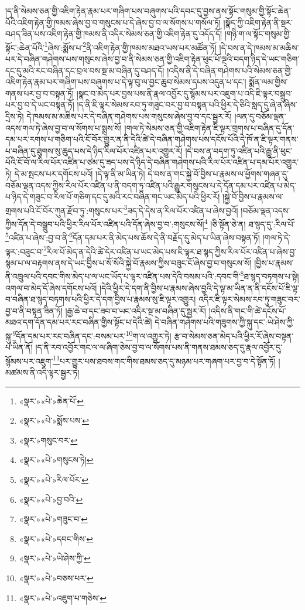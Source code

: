 །ད་ནི་སེམས་ཅན་གྱི་འཇིག་རྟེན་རྣམ་པར་གཞིག་པས་བཞུགས་པའི་དབང་དུ་བྱས་ནས་སྟོང་གསུམ་གྱི་སྟོང་ཆེན་པོའི་འཇིག་རྟེན་གྱི་ཁམས་ཞེས་བྱ་བ་གསུངས་པ་དེ་ཞེས་བྱ་བ་ལ་སོགས་པ་གསོལ་ཏོ། །སྣོད་ཀྱི་འཇིག་རྟེན་ནི་སྔར་བཤད་ཟིན་པས་འཇིག་རྟེན་གྱི་ཁམས་ནི་འདིར་སེམས་ཅན་གྱི་འཇིག་རྟེན་དུ་འདོད་དོ། །གཉི་ག་ལ་སྟོང་གསུམ་གྱི་སྟོང་:ཆེན་པོའི་\footnote{«སྣར་»«པེ་»ཆེན་པོ་}ཞེས་:སྨོས་པ་\footnote{«སྣར་»«པེ་»སྨོས་པས་}ནི་འཇིག་རྟེན་གྱི་ཁམས་མཐའ་ཡས་པར་མཚོན་ཏོ། །དེ་བས་ན་དེ་ཁམས་མ་མཆིས་པར་དེ་བཞིན་གཤེགས་པས་གསུངས་ཞེས་བྱ་བ་ནི་སེམས་ཅན་གྱི་འཇིག་རྟེན་ཕུང་པོ་ལྔའི་བདག་ཉིད་དེ་ཡང་གཅིག་དང་དུ་མའི་རང་བཞིན་དང་བྲལ་བས་སྔ་མ་བཞིན་དུ་བཤད་དོ། །འདིས་ནི་དེ་བཞིན་གཤེགས་པའི་སེམས་ཅན་གྱི་འཇིག་རྟེན་རྣམ་པར་གཞིག་པས་བཞུགས་པ་དེ་ལྟ་བུ་ལ་བྱང་ཆུབ་སེམས་དཔས་འདུན་པ་དང་། སྨོན་ལམ་གྱིས་གནས་པར་བྱ་བ་བསྟན་ཏོ། །སྣང་བ་མེད་པར་བྱས་པས་ནི་རྣལ་འབྱོར་དུ་སྙོམས་པར་འཇུག་པ་འདི་ཇི་ལྟར་བསྒྲུབ་པར་བྱ་བ་དེ་ཡང་བསྟན་ཏོ། །ད་ནི་ཇི་ལྟར་སེམས་རབ་ཏུ་གཟུང་བར་བྱ་བ་བསྟན་པའི་ཕྱིར་དེ་ཅིའི་སླད་དུ་ཞེ་ན་ཞེས་དྲིས་ཏེ། དེ་ཁམས་མ་མཆིས་པར་དེ་བཞིན་གཤེགས་པས་གསུངས་ཞེས་བྱ་བ་དང་སྦྱར་རོ། །ལན་དུ་བཅོམ་ལྡན་འདས་གལ་ཏེ་ཞེས་བྱ་བ་ལ་སོགས་པ་སྨྲས་སོ། །གལ་ཏེ་སེམས་ཅན་གྱི་འཇིག་རྟེན་ཇི་ལྟར་གྲགས་པ་བཞིན་དུ་དོན་དམ་པར་རགས་པ་གཅིག་པའི་ངོ་བོར་གྱུར་ན་ནི་དེའི་ཚེ་དེ་བཞིན་གཤེགས་པས་དངོས་པོའི་དེ་ཁོ་ན་ཇི་ལྟར་གནས་པ་བཞིན་དུ་ཐུགས་སུ་ཆུད་པས་དེ་ཉིད་རིལ་པོར་འཛིན་པར་འགྱུར་རོ། །དེ་བས་ན་བདག་ཏུ་འཛིན་པའི་རྒྱུ་ནི་ཕུང་པོའི་ངོ་བོ་ལ་རིལ་པོར་འཛིན་པ་ཙམ་དུ་ཟད་པས་དེ་ཉིད་དེ་བཞིན་གཤེགས་པའི་རིལ་པོར་འཛིན་པ་དམ་པོར་འགྱུར་ཏེ། དེ་མ་སྤངས་པར་དགོངས་པའོ། །དེ་ལྟ་ནི་མ་ཡིན་ཏེ། དེ་བས་ན་གང་སྐྱེ་བོ་བྱིས་པ་རྣམས་ལ་ཕྱོགས་གཞན་དུ་བཅོམ་ལྡན་འདས་ཀྱིས་རིལ་པོར་འཛིན་པ་ནི་བདག་ཏུ་འཛིན་པའི་རྒྱུར་གསུངས་པ་དེ་དོན་དམ་པར་འཛིན་པ་མེད་པ་ཉིད་དེ་གཟུང་བ་རིལ་པོ་གཅིག་དང་དུ་མའི་རང་བཞིན་གང་ཡང་མེད་པའི་ཕྱིར་རོ། །སྐྱེ་བོ་བྱིས་པ་རྣམས་ལ་གྲགས་པའི་ངོ་བོར་ཀུན་རྫོབ་ཏུ་:གསུངས་པར་\footnote{«སྣར་»གསུང་བར་}ཟད་དེ་དེས་ན་རིལ་པོར་འཛིན་པ་ཞེས་བྱའོ། །བཅོམ་ལྡན་འདས་ཀྱིས་དོན་དེ་བསྒྲུབ་པའི་ཕྱིར་རིལ་པོར་འཛིན་པའི་དོན་ཞེས་བྱ་བ་:གསུངས་སོ།\footnote{«སྣར་»«པེ་»གསུངས་ཏེ།} །ཅི་སྟོན་ཅེ་ན། ཐ་སྙད་དུ་:རིལ་པོ་\footnote{«སྣར་»«པེ་»རིལ་པོར་}འཛིན་པ་ཞེས་:བྱ་བ་ནི་\footnote{«སྣར་»«པེ་»བྱ་བའི་}དོན་དམ་པར་ནི་མེད་པས་ཆོས་དེ་ནི་བརྗོད་དུ་མེད་པ་ཡིན་ཞེས་བསྟན་ཏོ། །གལ་ཏེ་དེ་ལྟར་:བཟུང་བ་\footnote{«སྣར་»«པེ་»གཟུང་བ་}རིལ་པོ་མེད་ན་དེའི་ཚེ་དེར་འཛིན་པ་ཡང་མེད་པས་ཇི་ལྟར་ཐ་སྙད་ཀྱིས་རིལ་པོར་འཛིན་པ་ཞེས་བྱ་སྙམ་པ་ལ་བརྟགས་ནས་དེ་ཡང་བྱིས་པ་སོ་སོའི་སྐྱེ་བོ་རྣམས་ཀྱིས་བཟུང་ངོ་ཞེས་བྱ་བ་གསུངས་སོ། །བྱིས་པ་རྣམས་ནི་འཁྲུལ་པའི་དབང་གིས་མེད་པ་ལ་ཡང་ཡོད་པ་ལྟར་འཛིན་པས་དེའི་བསམ་པའི་:དབང་གི་\footnote{«སྣར་»«པེ་»དབང་གིས་}ཐ་སྙད་བཏགས་པ་སྟེ། འགལ་བ་མེད་དོ་ཞེས་དགོངས་པའོ། །དེའི་ཕྱིར་དེ་དག་ནི་བྱིས་པ་རྣམས་ཞེས་བྱའི་དེ་ལྟ་མ་ཡིན་ན་ནི་དངོས་པོ་ཇི་ལྟ་བ་བཞིན་ཐ་སྙད་བཏགས་པའི་ཕྱིར་དེ་དག་བྱིས་པ་རྣམས་སུ་ཇི་ལྟར་འགྱུར། འདིར་ཇི་ལྟར་སེམས་རབ་ཏུ་གཟུང་བར་བྱ་བ་ནི་བསྟན་ཟིན་ཏོ། །རྒྱ་ཆེ་བ་དང་ཟབ་བ་ཡང་འདིར་སྔ་མ་བཞིན་དུ་སྦྱར་རོ། །འདིས་ནི་གང་གི་ཚེ་དངོས་པོ་མཐའ་དག་དོན་དམ་པར་རང་བཞིན་གྱིས་སྟོང་པ་དེའི་ཚེ། དེ་བཞིན་གཤེགས་པའི་གཟུགས་ཀྱི་སྐུ་དང་:ཡེ་ཤེས་ཀྱི་སྐུ་\footnote{«སྣར་»«པེ་»ཡེ་ཤེས་ཀྱི་}དོན་དམ་པར་རང་བཞིན་དང་:བསམ་པར་\footnote{«སྣར་»«པེ་»བཅས་པར་}ག་ལ་འགྱུར་ཏེ། རྩ་བ་སེམས་ཅན་མེད་པའི་ཕྱིར་རོ་ཞེས་བསྟན་པ་ཡིན་ནོ། །ད་ནི་རབ་འབྱོར་གང་ལ་ལ་ཞིག་ཅེས་བྱ་བ་ལ་སོགས་པས་ནི་གནས་ཐམས་ཅད་དུ་རྣལ་འབྱོར་དུ་སྙོམས་པར་འཇུག་\footnote{«སྣར་»«པེ་»འཇུག་པ་གཅེས་}པར་གྱུར་པས་ཐབས་གང་གིས་ཐམས་ཅད་དུ་མཉམ་པར་གཞག་པར་བྱ་བ་དེ་སྟོན་ཏོ། །མཚམས་ནི་འདི་ལྟར་སྦྱར་ཏེ། 